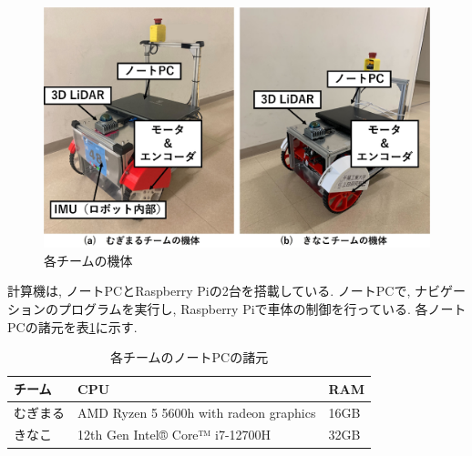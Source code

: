\documentclass[twocolumn,9pt]{jsproceedings}
\begin{document}
 \begin{figure}[htbp]
   \begin{center}
     \includegraphics[width=1.0\linewidth]{figs/robot.eps}
     \caption{各チームの機体}
     \label{fig:robot}
   \end{center}
 \end{figure}


計算機は, ノートPCとRaspberry Piの2台を搭載している. 
ノートPCで, ナビゲーションのプログラムを実行し, 
Raspberry Piで車体の制御を行っている. 
各ノートPCの諸元を表\ref{table:laptop}に示す. 

\begin{table}[H]
  \centering
  \caption{各チームのノートPCの諸元}
  \label{table:laptop}
	  \begin{tabular}{|l|p{5.0cm}|l|}
    \hline
    チーム   & CPU & RAM\\ 
    \hline
    むぎまる & AMD Ryzen 5 5600h with radeon graphics & 16GB \\
    \hline
    きなこ   & 12th Gen Intel® Core™ i7-12700H  & 32GB \\
    \hline
  \end{tabular}
\end{table}
\end{document}
